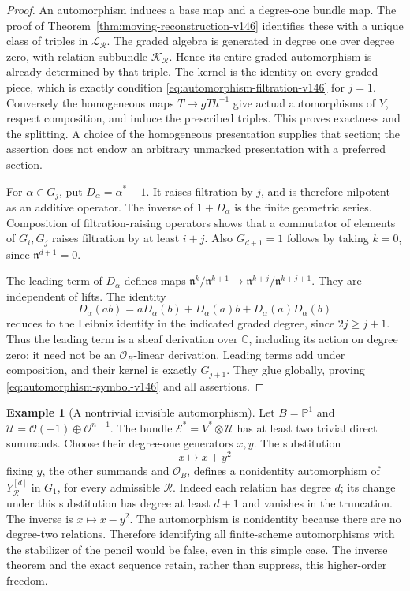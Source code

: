 \documentclass[11pt,reqno]{amsart}
\numberwithin{equation}{section}
\theoremstyle{definition}\newtheorem{definition}[theorem]{Definition}
\newtheorem{example}[theorem]{Example}
\theoremstyle{remark}\newtheorem{remark}[theorem]{Remark}
\newcommand{\C}{\mathbb C}\newcommand{\Q}{\mathbb Q}
\newcommand{\Pj}{\mathbb P}\newcommand{\A}{\mathbb A}
\newcommand{\OO}{\mathcal O}\newcommand{\II}{\mathcal I}
\begin{document}
\begin{proof}
An automorphism induces a base map and a degree-one bundle map.  The
proof of Theorem~\ref{thm:moving-reconstruction-v146} identifies these
with a unique class of triples in \(\mathscr L_{\mathcal R}\).
The graded algebra is generated in degree one over degree zero, with
relation subbundle \(\mathcal K_{\mathcal R}\).  Hence its entire
graded automorphism is already determined by that triple.  The kernel
is the identity on every graded piece, which is exactly condition
\eqref{eq:automorphism-filtration-v146} for \(j=1\).
Conversely the homogeneous maps \(T\mapsto gTh^{-1}\) give actual
automorphisms of \(Y\), respect composition, and induce the prescribed
triples.  This proves exactness and the splitting.  A choice of the
homogeneous presentation supplies that section; the assertion does
not endow an arbitrary unmarked presentation with a preferred section.

For \(\alpha\in G_j\), put \(D_\alpha=\alpha^*-1\).  It raises
filtration by \(j\), and is therefore nilpotent as an additive
operator.  The inverse of \(1+D_\alpha\) is the finite geometric
series.  Composition of filtration-raising operators shows that a
commutator of elements of \(G_i,G_j\) raises filtration by at least
\(i+j\).  Also \(G_{d+1}=1\) follows by taking \(k=0\), since
\(\mathfrak n^{d+1}=0\).

The leading term of \(D_\alpha\) defines maps
\(\mathfrak n^k/\mathfrak n^{k+1}\to
\mathfrak n^{k+j}/\mathfrak n^{k+j+1}\).
They are independent of lifts.  The identity
\[
 D_\alpha(ab)=aD_\alpha(b)+D_\alpha(a)b+
                           D_\alpha(a)D_\alpha(b)
\]
reduces to the Leibniz identity in the indicated graded degree, since
\(2j\ge j+1\).  Thus the leading term is a sheaf derivation over
\(\C\), including its action on degree zero; it need not be an
\(\OO_B\)-linear derivation.  Leading terms add under composition,
and their kernel is exactly \(G_{j+1}\).  They glue globally,
proving \eqref{eq:automorphism-symbol-v146} and all assertions.
\end{proof}

\begin{example}[A nontrivial invisible automorphism]
\label{ex:invisible-shear-v146}
Let \(B=\Pj^1\) and
\(\mathcal U=\OO(-1)\oplus\OO^{n-1}\).
The bundle \(\mathcal E^*=V^*\otimes\mathcal U\) has at least two
trivial direct summands.  Choose their degree-one generators \(x,y\).
The substitution
\[
                          x\longmapsto x+y^2
\]
fixing \(y\), the other summands and \(\OO_B\), defines a nonidentity
automorphism of \(Y_{\mathcal R}^{[d]}\) in \(G_1\), for every
admissible \(\mathcal R\).  Indeed each relation has degree \(d\);
its change under this substitution has degree at least \(d+1\) and
vanishes in the truncation.  The inverse is \(x\mapsto x-y^2\).
The automorphism is nonidentity because there are no degree-two
relations.  Therefore identifying all finite-scheme automorphisms
with the stabilizer of the pencil would be false, even in this simple
case.  The inverse theorem and the exact sequence retain, rather than
suppress, this higher-order freedom.
\end{example}
\end{document}
